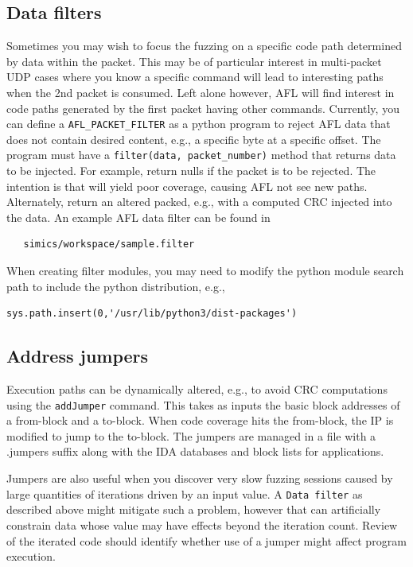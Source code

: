 \documentclass[titlepage]{article}
\begin{document}
\subsection{Data filters}
\label{packet-filters}
Sometimes you may wish to focus the fuzzing on a specific code path determined by data within the packet.  This may be of particular
interest in multi-packet UDP cases where you know a specific command will lead to interesting paths when the 2nd packet is consumed.
Left alone however, AFL will find interest in code paths generated by the first packet having other commands.  Currently, you can
define a {\tt AFL\_PACKET\_FILTER} as a python program to reject AFL data that does not contain desired content, e.g., a specific byte
at a specific offset.  The program must have a {\tt filter(data, packet\_number)} method that returns data to be injected.  
For example, return nulls if the packet is to be rejected.  The intention is that will yield poor coverage, causing AFL not see new paths.
Alternately, return an altered packed, e.g., with a computed CRC injected into the data.
An example AFL data filter can be found in 
\begin{verbatim}
   simics/workspace/sample.filter
\end{verbatim}
When creating filter modules, you may need to modify the python module search path to include the python distribution, e.g., 
\begin{verbatim}
sys.path.insert(0,'/usr/lib/python3/dist-packages')
\end{verbatim}

\subsection{Address jumpers}
\label{jumpers}
Execution paths can be dynamically altered, e.g., to avoid CRC computations using the {\tt addJumper} command.  This takes as inputs
the basic block addresses of a from-block and a to-block. When code coverage hits the from-block, the IP is modified to jump to the
to-block.  The jumpers are managed in a file with a .jumpers suffix along with the IDA databases and block lists for applications.

Jumpers are also useful when you discover very slow fuzzing sessions caused by large quantities of iterations driven by an input value.
A {\tt Data filter} as described above might mitigate such a problem, however that can artificially constrain data whose value may
have effects beyond the iteration count.  Review of the iterated code should identify whether use of a jumper might affect program
execution.
\end{document}
